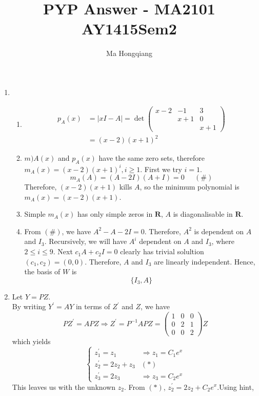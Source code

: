 \documentclass[12pt]{article}
\theoremstyle{definition}
\begin{document}
\title{PYP Answer - MA2101 AY1415Sem2}
\author{Ma Hongqiang}
\maketitle
\begin{enumerate}
  \item %
  \begin{enumerate}
    \item %
    \begin{align*}
p_A(x) &= |xI-A| = \det\begin{pmatrix} x-2&-1&3\\&x+1&0\\&&x+1\end{pmatrix}\\
&=(x-2)(x+1)^2
    \end{align*}
    \item $m)A(x)$ and $p_A(x)$ have the same zero sets, therefore $m_A(x) = (x-2)(x+1)^i, i\geq 1$. First we try $i = 1$.
    \[
m_A(A) = (A-2I)(A+I) = 0\;\;\;\;\;(\#)
    \]
    Therefore, $(x-2)(x+1)$ kills $A$, so the minimum polynomial is $m_A(x) = (x-2)(x+1)$.
    \item Simple $m_A(x)$ has only simple zeros in $\mathbf{R}$, $A$ is diagonalisable in $\mathbf{R}$.
    \item From $(\#)$, we have $A^2-A-2I = 0$. Therefore, $A^2$ is dependent on $A$ and $I_3$. Recursively, we will have $A^i$ dependent on $A$ and $I_3$, where $2\leq i \leq 9$.
    Next $c_1A+c_2I = 0$ clearly has trivial solultion $(c_1,c_2) = (0,0)$. Therefore, $A$ and $I_3$ are linearly independent. Hence, the basis of $W$ is
    \[
\{I_3,A\}
    \]
  \end{enumerate}
  \item Let $Y=PZ$.\\
  By writing $Y^\prime= AY$ in terms of $Z^\prime$ and $Z$, we have
  \[
PZ^\prime = APZ \Rightarrow Z^\prime = P^{-1}APZ = \begin{pmatrix}1&0&0\\0&2&1\\0&0&2\end{pmatrix}Z
  \]
  which yields
  \[
  \begin{cases}
  z_1^\prime = z_1&\Rightarrow z_1 = C_1e^x\\
  z_2^\prime =2z_2+z_3&(\ast)\\
  z_3^\prime =2z_3&\Rightarrow z_3 = C_2e^x
  \end{cases}
  \]
  This leaves us with the unknown $z_2$. From $(\ast)$, $z_2^\prime = 2z_2+C_2e^x$.Using hint,

\end{enumerate}
\end{document}
